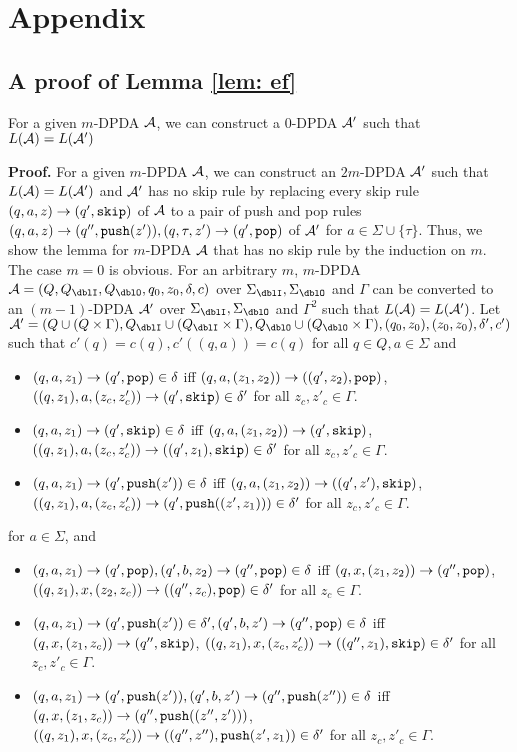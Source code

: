 \appendix
\section{Appendix}

\subsection{A proof of Lemma \ref{lem: ef}}
\setcounter{lemma}{\ref{lem: ef}}
\addtocounter{lemma}{-1}
\begin{lemma}
For a given $m$-DPDA ${\cal A}$,
we can construct a $0$-DPDA ${\cal A}'$ such that
$L({\cal A})=L({\cal A}')$
\end{lemma}
{\bf Proof.}\quad
For a given $m$-DPDA ${\cal A}$,
we can construct an $2m$-DPDA ${\cal A}'$ such that
$L({\cal A})=L({\cal A}')$ and
${\cal A}'$ has no skip rule
by replacing every skip rule $(q,a,z)\to (q',\mathtt{skip})$ of ${\cal A}$
to a pair of push and pop rules
$(q,a,z)\to(q'',\mathtt{push}(z')), (q,\tau,z')\to(q',\mathtt{pop})$ of ${\cal A}'$
for $a\in \Sigma\cup\{\tau\}$.
Thus, we show the lemma for $m$-DPDA ${\cal A}$ that has no skip rule
by the induction on $m$.
The case $m=0$ is obvious.
For an arbitrary $m$,
$m$-DPDA $\calA=(Q, Q_\dblI, Q_\dblO, q_0,z_0,\delta,c)$
over $\Sigma_\dblI, \Sigma_\dblO$ and $\Gamma$
can be converted to an
$(m-1)$-DPDA ${\cal A}'$
over $\Sigma_\dblI, \Sigma_\dblO$ and $\Gamma^2$
such that $L({\cal A})=L({\cal A}')$.
Let $\calA'=(Q\cup(Q\times\Gamma), Q_\dblI\cup(Q_\dblI\times\Gamma), Q_\dblO\cup(Q_\dblO\times\Gamma), (q_0,z_0), (z_0,z_0),\delta',c')$
such that
$c'(q)=c(q), c'((q,a))=c(q)$ for all $q\in Q, a\in\Sigma$ and
\begin{itemize}
\item
$(q,a,z_1)\to (q',\mathtt{pop})\in\delta$
iff
$(q,a,(z_1,z_2))\to ((q',z_2),\mathtt{pop})$,
$((q,z_1),a,(z_c,z'_c))\to (q',\mathtt{skip})\in\delta'$
for all $z_c,z'_c\in\Gamma$.
\item
$(q,a,z_1)\to (q',\mathtt{skip})\in\delta$
iff
$(q,a,(z_1,z_2))\to (q',\mathtt{skip})$,
$((q,z_1),a,(z_c,z'_c))\to ((q',z_1),\mathtt{skip})\in\delta'$
for all $z_c,z'_c\in\Gamma$.
\item
$(q,a,z_1)\to (q',\mathtt{push}(z'))\in\delta$
iff
$(q,a,(z_1,z_2))\to ((q',z'),\mathtt{skip})$,
$((q,z_1),a,(z_c,z'_c))\to (q',\mathtt{push}((z',z_1)))\in\delta'$
for all $z_c,z'_c\in\Gamma$.
\end{itemize}
for $a\in\Sigma$, and
\begin{itemize}
\item
$(q,a,z_1)\to (q',\mathtt{pop}), (q',b,z_2)\to (q'',\mathtt{pop})\in\delta$
iff
$(q,x,(z_1,z_2))\to (q'',\mathtt{pop})$,
$((q,z_1),x,(z_2,z_c))\to ((q'',z_c),\mathtt{pop})\in\delta'$
for all $z_c\in\Gamma$.
\item
$(q,a,z_1)\to (q',\mathtt{push}(z'))\in\delta', (q',b,z')\to (q'',\mathtt{pop})\in\delta$
iff
$(q,x,(z_1,z_c))\to (q'',\mathtt{skip})$,
$((q,z_1),x,(z_c,z'_c))\to ((q'',z_1),\mathtt{skip})\in\delta'$
for all $z_c, z'_c\in\Gamma$.
\item
$(q,a,z_1)\to (q',\mathtt{push}(z')), (q',b,z')\to (q'',\mathtt{push}(z''))\in\delta$
iff
$(q,x,(z_1,z_c))\to (q'',\mathtt{push}((z'',z')))$,
$((q,z_1),x,(z_c,z'_c))\to ((q'',z''),\mathtt{push}(z',z_1))\in\delta'$
for all $z_c, z'_c\in\Gamma$.
\end{itemize}
